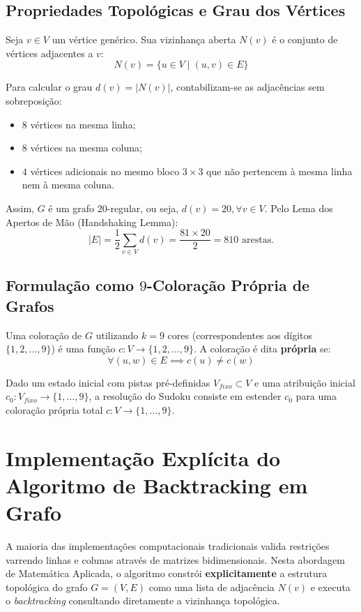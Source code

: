 \documentclass[12pt, a4paper]{article}
\begin{document}
\subsection{Propriedades Topológicas e Grau dos Vértices}
Seja $v \in V$ um vértice genérico. Sua vizinhança aberta $N(v)$ é o conjunto de vértices adjacentes a $v$:
\begin{equation}
    N(v) = \{u \in V \mid (u,v) \in E\}
\end{equation}

Para calcular o grau $d(v) = |N(v)|$, contabilizam-se as adjacências sem sobreposição:
\begin{itemize}
    \item $8$ vértices na mesma linha;
    \item $8$ vértices na mesma coluna;
    \item $4$ vértices adicionais no mesmo bloco $3 \times 3$ que não pertencem à mesma linha nem à mesma coluna.
\end{itemize}

Assim, $G$ é um grafo $20$-regular, ou seja, $d(v) = 20, \forall v \in V$. Pelo Lema dos Apertos de Mão (Handshaking Lemma):
\begin{equation}
    |E| = \frac{1}{2} \sum_{v \in V} d(v) = \frac{81 \times 20}{2} = 810 \text{ arestas.}
\end{equation}

\subsection{Formulação como $9$-Coloração Própria de Grafos}
Uma coloração de $G$ utilizando $k = 9$ cores (correspondentes aos dígitos $\{1, 2, \dots, 9\}$) é uma função $c: V \to \{1, 2, \dots, 9\}$. A coloração é dita \textbf{própria} se:
\begin{equation}
    \forall (u,w) \in E \implies c(u) \neq c(w)
\end{equation}

Dado um estado inicial com pistas pré-definidas $V_{fixo} \subset V$ e uma atribuição inicial $c_0: V_{fixo} \to \{1, \dots, 9\}$, a resolução do Sudoku consiste em estender $c_0$ para uma coloração própria total $c: V \to \{1, \dots, 9\}$.

\section{Implementação Explícita do Algoritmo de Backtracking em Grafo}

A maioria das implementações computacionais tradicionais valida restrições varrendo linhas e colunas através de matrizes bidimensionais. Nesta abordagem de Matemática Aplicada, o algoritmo constrói \textbf{explicitamente} a estrutura topológica do grafo $G=(V,E)$ como uma lista de adjacência $N(v)$ e executa o \textit{backtracking} consultando diretamente a vizinhança topológica.
\end{document}
